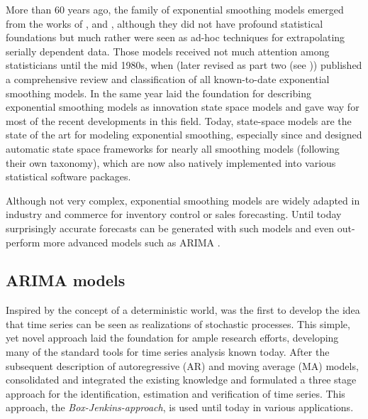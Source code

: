 More than 60 years ago, the family of exponential smoothing models emerged from the works of \citet{brown1962smoothing}, \citet{holt1957forecasting} and \citet{winters1960forecasting}, although they did not have profound statistical foundations but much rather were seen as ad-hoc techniques for extrapolating serially dependent data. Those models received not much attention among statisticians until the mid 1980s, when \citet{gardner1985exponential} (later revised as part two (see \citet{gardner2006exponential})) published a comprehensive review and classification of all known-to-date exponential smoothing models. In the same year \citet{snyder1985recursive} laid the foundation for describing exponential smoothing models as innovation state space models and gave way for most of the recent developments in this field. Today, state-space models are the state of the art for modeling exponential smoothing, especially since \citet{hyndman2002state} and \citet{taylor2003exponential} designed automatic state space frameworks for nearly all smoothing models (following their own taxonomy), which are now also natively implemented into various statistical software packages.

Although not very complex, exponential smoothing models are widely adapted in industry and commerce for inventory control or sales forecasting. Until today surprisingly accurate forecasts can be generated with such models \citep{chatfield2001new} and even out-perform more advanced models such as ARIMA \citep{hyndman2001s}.


\subsection*{ARIMA models}

Inspired by the concept of a deterministic world, \citet{yule1927vii} was the first to develop the idea that time series can be seen as realizations of stochastic processes. This simple, yet novel approach laid the foundation for ample research efforts, developing many of the standard tools for time series analysis known today. After the subsequent description of autoregressive (AR) and moving average (MA) models, \citet{box1976time} consolidated and integrated the existing knowledge and formulated a three stage approach for the identification, estimation and verification of time series. This approach, the \textit{Box-Jenkins-approach}, is used until today in various applications. 

